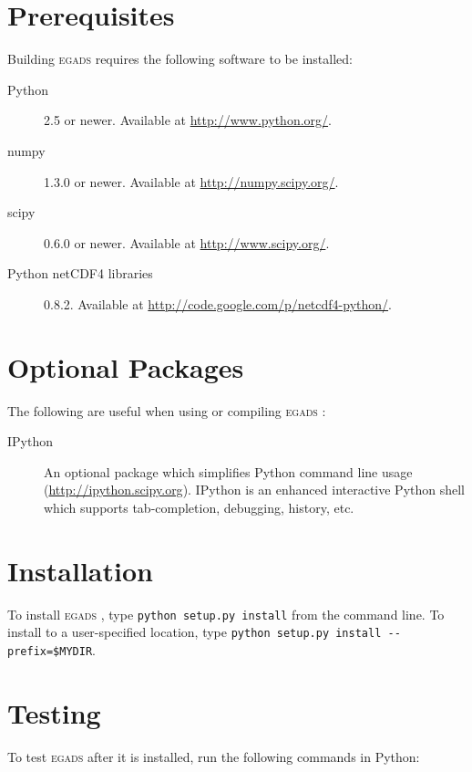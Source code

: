 \documentclass[a4paper,11pt]{report}
\newcommand{\egads}{\textsc{egads} }
\begin{document}
\section{Prerequisites}

Building \egads requires the following software to be installed:

\begin{description}
 \item[Python] 2.5 or newer. Available at \href{http://www.python.org/}{http://www.python.org/}.
 \item[numpy] 1.3.0 or newer. Available at \href{http://numpy.scipy.org/}{http://numpy.scipy.org/}.
 \item[scipy] 0.6.0 or newer. Available at \href{http://www.scipy.org/}{http://www.scipy.org/}.
 \item[Python netCDF4 libraries] 0.8.2. Available at \href{http://code.google.com/p/netcdf4-python/}{http://code.google.com/p/netcdf4-python/}.
\end{description}

\section{Optional Packages}

The following are useful when using or compiling \egads:

\begin{description}
 \item[IPython] An optional package which simplifies Python command line usage (\href{http://ipython.scipy.org}{http://ipython.scipy.org}). IPython is an enhanced interactive Python shell which supports tab-completion, debugging, history, etc. 

 \end{description}

\section{Installation}
To install \egads, type \verb|python setup.py install| from the command line. To install to a user-specified location, type \verb|python setup.py install --prefix=$MYDIR|. 

\section{Testing}

To test \egads after it is installed, run the following commands in Python:
\end{document}
